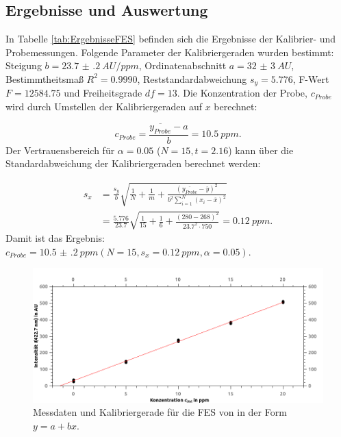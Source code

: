 \subsection{Ergebnisse und Auswertung}
  
  In Tabelle \ref{tab:ErgebnisseFES} befinden sich die Ergebnisse der Kalibrier- und Probemessungen. Folgende Parameter der Kalibriergeraden wurden bestimmt: Steigung $b = \SI[mode=text,separate-uncertainty]{23.7(2)}{AU\per ppm}$, Ordinatenabschnitt $a = \SI[mode=text,separate-uncertainty]{32(3)}{AU}$, Bestimmtheitsmaß $R^2 = 0.9990$, Reststandardabweichung $s_y = 5.776$, F-Wert $F = 12584.75$ und Freiheitsgrade $df = 13$. Die Konzentration der Probe, $c_{Probe}$ wird durch Umstellen der Kalibriergeraden auf $x$ berechnet:
  
    \begin{equation}
      c_{Probe} = \frac{\overline{y_{Probe}} - a}{b} = \SI[mode=text]{10.5}{ppm}.
    \end{equation}
  Der Vertrauensbereich für $\alpha = 0.05$ ($N = 15, t = 2.16$) kann über die Standardabweichung der Kalibriergeraden berechnet werden:
  
    \begin{equation}
      \begin{split}
        s_x &= \frac{s_y}{b} \sqrt{\frac{1}{N} + \frac{1}{m} + \frac{\left(\overline{y_{Probe}} - \overline{y}\right)^2}{b^2 \sum_{i=1}^N \left(x_i - \overline{x}\right)^2}} \\
            &= \frac{5.776}{23.7} \sqrt{\frac{1}{15} + \frac{1}{6} + \frac{\left(280 - 268\right)^2}{23.7^2 \cdot 750}} = \SI[mode=text]{0.12}{ppm}.
      \end{split}
    \end{equation}
  Damit ist das Ergebnis: $c_{Probe} = \SI[mode=text, multi-part-units = brackets, separate-uncertainty]{10.5(2)}{ppm} \left(N = 15, s_x = \SI[mode=text]{0.12}{ppm}, \alpha = 0.05\right)$.
  
  \begin{figure}[H]
    \includegraphics[scale=0.5, center]{images/KalibriergeradeFESCa.png} 
    \caption[Messdaten und Kalibriergerade für die FES von , Quelle: Autor]{Messdaten und Kalibriergerade für die FES von  in der Form $y = a + bx$.}
    \label{fig:KalibriergeradeEisen}
  \end{figure}
  
